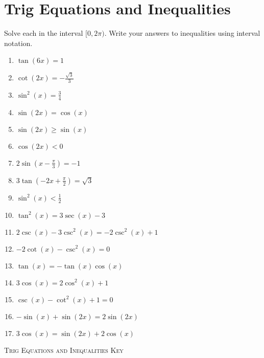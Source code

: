 \chapter{Trig Equations and Inequalities}

Solve each in the interval $[0,2\pi)$. Write your answers to inequalities using interval notation.

\begin{enumerate}
	\item $\tan(6x) = 1$
    \item $\cot(2x) = -\frac{\sqrt{3}}{3}$
    \item $\sin^2 (x) = \frac{3}{4}$
    \item $\sin(2x) = \cos(x)$
    \item $\sin(2x) \geq \sin(x)$
    \item $\cos(2x) < 0$
    \item $2\sin\left(x-\frac{\pi}{3}\right) = -1$
    \item $3\tan\left(-2x+\frac{\pi}{2}\right)=\sqrt{3}$
    \item $\sin^2(x) < \frac{1}{2}$
    
    \item $\tan^2(x) = 3\sec(x) - 3$
    \item $2\csc(x) - 3\csc^2(x) = -2\csc^2(x) + 1$
    \item $-2\cot(x) - \csc^2(x) = 0$
    \item $\tan(x) = -\tan(x)\cos(x)$
    \item $3\cos(x) = 2\cos^2(x) + 1$
    \item $\csc(x) - \cot^2(x) + 1 = 0$
    \item $-\sin(x) + \sin(2x) = 2\sin(2x)$
    \item $3\cos(x) = \sin(2x) + 2\cos(x)$
\end{enumerate}

\newpage

\textsc{Trig Equations and Inequalities Key}

